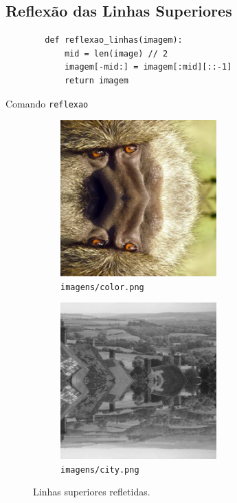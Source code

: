 \subsection{Reflexão das Linhas Superiores}

\begin{listing}[H]
    \begin{verbatim}
        def reflexao_linhas(imagem):
            mid = len(image) // 2
            imagem[-mid:] = imagem[:mid][::-1]
            return imagem
    \end{verbatim}

    \caption{Comando \texttt{reflexao}}
\end{listing}

\begin{figure}[H]
    \centering
    \begin{subfigure}{0.45\textwidth}
        \centering
        \includegraphics[width=6cm]{resultados/colorrefl.png}
        \caption{\texttt{imagens/color.png}}
    \end{subfigure}%
    \begin{subfigure}{0.45\textwidth}
        \centering
        \includegraphics[width=6cm]{resultados/cityrefl.png}
        \caption{\texttt{imagens/city.png}}
    \end{subfigure}

    \caption{Linhas superiores refletidas.}
\end{figure}
